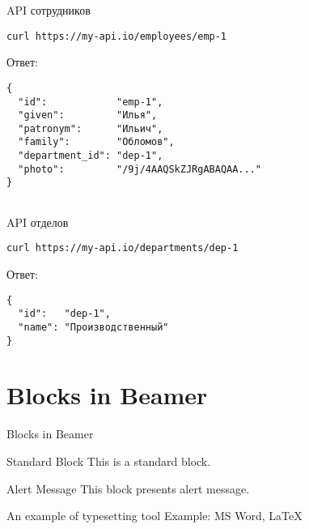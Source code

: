 \documentclass{beamer}
\begin{document}
\begin{frame}[fragile]{API сотрудников}
\begin{verbatim}
curl https://my-api.io/employees/emp-1
\end{verbatim}

Ответ:

\begin{verbatim}
{
  "id":            "emp-1",
  "given":         "Илья",
  "patronym":      "Ильич",
  "family":        "Обломов",
  "department_id": "dep-1",
  "photo":         "/9j/4AAQSkZJRgABAQAA..."
}
 
\end{verbatim}

\end{frame}

\begin{frame}[fragile]{API отделов}
\begin{verbatim}
curl https://my-api.io/departments/dep-1
\end{verbatim}

Ответ:

\begin{verbatim}
{
  "id":   "dep-1",
  "name": "Производственный"
}
\end{verbatim}

\end{frame}

\section{Blocks in Beamer}
\begin{frame}{Blocks in Beamer}
    \begin{block}{Standard Block}
        This is a standard block.
    \end{block}
    \begin{alertblock}{Alert Message}
        This block presents alert message.
    \end{alertblock}
    \begin{exampleblock}{An example of typesetting tool}
        Example: MS Word, \LaTeX{}
    \end{exampleblock}
\end{frame} 
\end{document}
